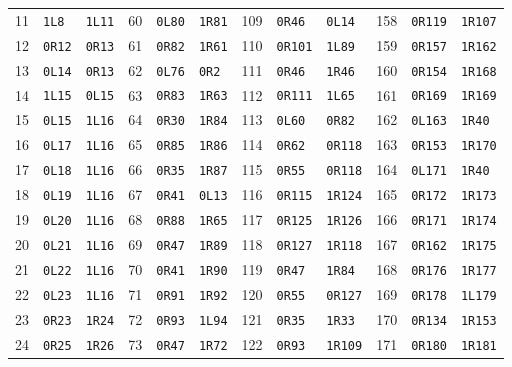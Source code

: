 \begin{center}
\begin{tabular}{rll@{\qquad}rll@{\qquad}rll@{\qquad}rll}
11 & \texttt{1L8} & \texttt{1L11} & 60 & \texttt{0L80} & \texttt{1R81} & 109 & \texttt{0R46} & \texttt{0L14} & 158 & \texttt{0R119} & \texttt{1R107}\\
12 & \texttt{0R12} & \texttt{0R13} & 61 & \texttt{0R82} & \texttt{1R61} & 110 & \texttt{0R101} & \texttt{1L89} & 159 & \texttt{0R157} & \texttt{1R162}\\
13 & \texttt{0L14} & \texttt{0R13} & 62 & \texttt{0L76} & \texttt{0R2} & 111 & \texttt{0R46} & \texttt{1R46} & 160 & \texttt{0R154} & \texttt{1R168}\\
14 & \texttt{1L15} & \texttt{0L15} & 63 & \texttt{0R83} & \texttt{1R63} & 112 & \texttt{0R111} & \texttt{1L65} & 161 & \texttt{0R169} & \texttt{1R169}\\
15 & \texttt{0L15} & \texttt{1L16} & 64 & \texttt{0R30} & \texttt{1R84} & 113 & \texttt{0L60} & \texttt{0R82} & 162 & \texttt{0L163} & \texttt{1R40}\\
16 & \texttt{0L17} & \texttt{1L16} & 65 & \texttt{0R85} & \texttt{1R86} & 114 & \texttt{0R62} & \texttt{0R118} & 163 & \texttt{0R153} & \texttt{1R170}\\
17 & \texttt{0L18} & \texttt{1L16} & 66 & \texttt{0R35} & \texttt{1R87} & 115 & \texttt{0R55} & \texttt{0R118} & 164 & \texttt{0L171} & \texttt{1R40}\\
18 & \texttt{0L19} & \texttt{1L16} & 67 & \texttt{0R41} & \texttt{0L13} & 116 & \texttt{0R115} & \texttt{1R124} & 165 & \texttt{0R172} & \texttt{1R173}\\
19 & \texttt{0L20} & \texttt{1L16} & 68 & \texttt{0R88} & \texttt{1R65} & 117 & \texttt{0R125} & \texttt{1R126} & 166 & \texttt{0R171} & \texttt{1R174}\\
20 & \texttt{0L21} & \texttt{1L16} & 69 & \texttt{0R47} & \texttt{1R89} & 118 & \texttt{0R127} & \texttt{1R118} & 167 & \texttt{0R162} & \texttt{1R175}\\
21 & \texttt{0L22} & \texttt{1L16} & 70 & \texttt{0R41} & \texttt{1R90} & 119 & \texttt{0R47} & \texttt{1R84} & 168 & \texttt{0R176} & \texttt{1R177}\\
22 & \texttt{0L23} & \texttt{1L16} & 71 & \texttt{0R91} & \texttt{1R92} & 120 & \texttt{0R55} & \texttt{0R127} & 169 & \texttt{0R178} & \texttt{1L179}\\
23 & \texttt{0R23} & \texttt{1R24} & 72 & \texttt{0R93} & \texttt{1L94} & 121 & \texttt{0R35} & \texttt{1R33} & 170 & \texttt{0R134} & \texttt{1R153}\\
24 & \texttt{0R25} & \texttt{1R26} & 73 & \texttt{0R47} & \texttt{1R72} & 122 & \texttt{0R93} & \texttt{1R109} & 171 & \texttt{0R180} & \texttt{1R181}\\

\end{tabular}
\end{center}
